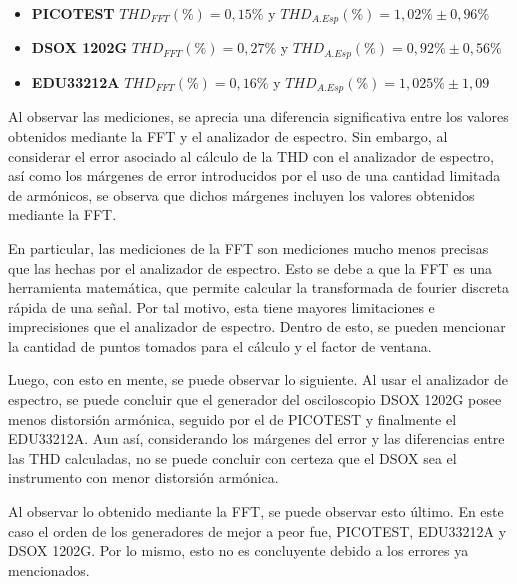 \begin{itemize}
\item \textbf{PICOTEST} $THD_{FFT} (\%)= 0,15\%$ y $THD_{A.Esp} (\%)= 1,02\% \pm 0,96 \%$
\item \textbf{DSOX 1202G} $THD_{FFT} (\%)= 0,27\%$ y $THD_{A.Esp} (\%)= 0,92\% \pm 0,56\%$
\item \textbf{EDU33212A} $THD_{FFT} (\%)= 0,16\%$ y $THD_{A.Esp} (\%)= 1,025 \% \pm 1,09$
\end{itemize}
\par
Al observar las mediciones, se aprecia una diferencia significativa entre los valores obtenidos mediante la FFT y el analizador de espectro. Sin embargo, al considerar el error asociado al cálculo de la THD con el analizador de espectro, así como los márgenes de error introducidos por el uso de una cantidad limitada de armónicos, se observa que dichos márgenes incluyen los valores obtenidos mediante la FFT.\par
En particular, las mediciones de la FFT son mediciones mucho menos precisas que las hechas por el analizador de espectro. Esto se debe a que la FFT es una herramienta matemática, que permite calcular la transformada de fourier discreta rápida de una señal. Por tal motivo, esta tiene mayores limitaciones e imprecisiones que el analizador de espectro. Dentro de esto, se pueden mencionar la cantidad de puntos tomados para el cálculo y el factor de ventana. \par
Luego, con esto en mente, se puede observar lo siguiente. Al usar el analizador de espectro, se puede concluir que el generador del osciloscopio DSOX 1202G posee menos distorsión armónica, seguido por el de PICOTEST y finalmente el EDU33212A. Aun así, considerando los márgenes del error y las diferencias entre las THD calculadas, no se puede concluir con certeza que el DSOX sea el instrumento con menor distorsión armónica. \par

Al observar lo obtenido mediante la FFT, se puede observar esto último. En este caso el orden de los generadores de mejor a peor fue, PICOTEST, EDU33212A y DSOX 1202G. Por lo mismo, esto no es concluyente debido a los errores ya mencionados. 

